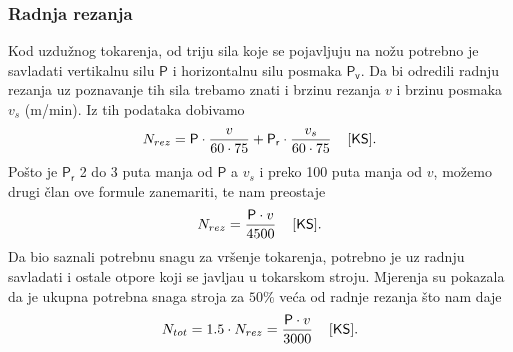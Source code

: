 \documentclass[a4paper,12pt]{article}
\numberwithin{figure}{section}
\begin{document}
\subsubsection{Radnja rezanja}
Kod uzdužnog tokarenja, od triju sila koje se pojavljuju na nožu potrebno je savladati vertikalnu silu $\mathsf{P}$ i horizontalnu silu posmaka $\mathsf{P_{v}}$. Da bi odredili radnju rezanja uz poznavanje tih sila trebamo znati i brzinu rezanja $v$ i brzinu posmaka $v_{s}$ (m/min). Iz tih podataka dobivamo
\begin{equation*}
N_{rez} = \mathsf{P} \cdot \frac{v}{60 \cdot 75} + \mathsf{P_{r}} \cdot \frac{v_{s}}{60 \cdot 75}\hspace*{0.4cm}[\mathsf{KS}].
\end{equation*}
Pošto je $\mathsf{P_{r}}$ 2 do 3 puta manja od $\mathsf{P}$ a $v_{s}$ i preko 100 puta manja od $v$, možemo drugi član ove formule zanemariti, te nam preostaje
\begin{equation*}
N_{rez} = \frac{\mathsf{P} \cdot v}{4500}\hspace*{0.4cm}[\mathsf{KS}].
\end{equation*}
Da bio saznali potrebnu snagu za vršenje tokarenja, potrebno je uz radnju savladati i ostale otpore koji se javljau u tokarskom stroju. Mjerenja su pokazala da je ukupna potrebna snaga stroja za $50\%$ veća od radnje rezanja što nam daje 
\begin{equation*}
N_{tot} =1.5 \cdot N_{rez} = \frac{\mathsf{P} \cdot v}{3000}\hspace*{0.4cm}[\mathsf{KS}].
\end{equation*}
\end{document}
